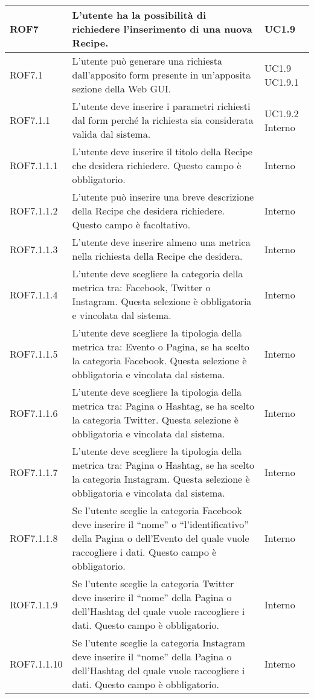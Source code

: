 \begin{center}
\begin{longtable}{| p{2.5cm} | p{8cm} | p{2cm} |}
		ROF7  & L'utente ha la possibilità di richiedere l'inserimento di una nuova Recipe. & UC1.9 \\
		\hline
		ROF7.1  & L'utente può generare una richiesta dall'apposito form presente in un'apposita sezione della Web GUI. & UC1.9 \newline UC1.9.1 \\
		\hline
		ROF7.1.1 & L'utente deve inserire i parametri richiesti dal form perché la richiesta sia considerata valida dal sistema. & UC1.9.2 \newline Interno \\
		\hline
		ROF7.1.1.1 & L'utente deve inserire il titolo della Recipe che desidera richiedere. Questo campo è obbligatorio. & Interno \\
		\hline
		ROF7.1.1.2 & L'utente può inserire una breve descrizione della Recipe che desidera richiedere. Questo campo è facoltativo. & Interno \\
		\hline
		ROF7.1.1.3 & L'utente deve inserire almeno una metrica nella richiesta della Recipe che desidera. & Interno \\
		\hline
		ROF7.1.1.4 & L'utente deve scegliere la categoria della metrica tra: Facebook, Twitter o Instagram. Questa selezione è obbligatoria e vincolata dal sistema. & Interno \\
		\hline
		ROF7.1.1.5 & L'utente deve scegliere la tipologia della metrica tra: Evento o Pagina, se ha scelto la categoria Facebook. Questa selezione è obbligatoria e vincolata dal sistema. & Interno \\
		\hline
		ROF7.1.1.6 & L'utente deve scegliere la tipologia della metrica tra: Pagina o Hashtag, se ha scelto la categoria Twitter. Questa selezione è obbligatoria e vincolata dal sistema. & Interno \\
		\hline
		ROF7.1.1.7 & L'utente deve scegliere la tipologia della metrica tra: Pagina o Hashtag, se ha scelto la categoria Instagram. Questa selezione è obbligatoria e vincolata dal sistema. & Interno \\
		\hline
		ROF7.1.1.8 & Se l'utente sceglie la categoria Facebook deve inserire il ``nome'' o ``l'identificativo'' della Pagina o dell'Evento del quale vuole raccogliere i dati. Questo campo è obbligatorio. & Interno \\
		\hline
		ROF7.1.1.9 & Se l'utente sceglie la categoria Twitter deve inserire il ``nome'' della Pagina o dell'Hashtag del quale vuole raccogliere i dati. Questo campo è obbligatorio. & Interno \\
		\hline
		ROF7.1.1.10 & Se l'utente sceglie la categoria Instagram deve inserire il ``nome'' della Pagina o dell'Hashtag del quale vuole raccogliere i dati. Questo campo è obbligatorio. & Interno \\

\end{longtable}
\end{center}
